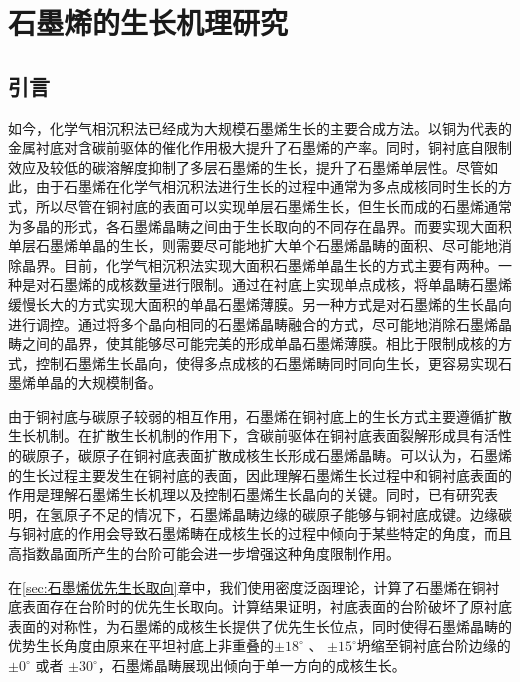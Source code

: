 \chapter{石墨烯的生长机理研究}
\section{引言}
    如今，化学气相沉积法已经成为大规模石墨烯生长的主要合成方法。以铜为代表的金属衬底对含碳前驱体的催化作用极大提升了石墨烯的产率。同时，铜衬底自限制效应及较低的碳溶解度抑制了多层石墨烯的生长，提升了石墨烯单层性。尽管如此，由于石墨烯在化学气相沉积法进行生长的过程中通常为多点成核同时生长的方式，所以尽管在铜衬底的表面可以实现单层石墨烯生长，但生长而成的石墨烯通常为多晶的形式，各石墨烯晶畴之间由于生长取向的不同存在晶界。而要实现大面积单层石墨烯单晶的生长，则需要尽可能地扩大单个石墨烯晶畴的面积、尽可能地消除晶界。目前，化学气相沉积法实现大面积石墨烯单晶生长的方式主要有两种。一种是对石墨烯的成核数量进行限制。通过在衬底上实现单点成核，将单晶畴石墨烯缓慢长大的方式实现大面积的单晶石墨烯薄膜。另一种方式是对石墨烯的生长晶向进行调控。通过将多个晶向相同的石墨烯晶畴融合的方式，尽可能地消除石墨烯晶畴之间的晶界，使其能够尽可能完美的形成单晶石墨烯薄膜。相比于限制成核的方式，控制石墨烯生长晶向，使得多点成核的石墨烯畴同时同向生长，更容易实现石墨烯单晶的大规模制备。
    
    由于铜衬底与碳原子较弱的相互作用，石墨烯在铜衬底上的生长方式主要遵循扩散生长机制。在扩散生长机制的作用下，含碳前驱体在铜衬底表面裂解形成具有活性的碳原子，碳原子在铜衬底表面扩散成核生长形成石墨烯晶畴。可以认为，石墨烯的生长过程主要发生在铜衬底的表面，因此理解石墨烯生长过程中和铜衬底表面的作用是理解石墨烯生长机理以及控制石墨烯生长晶向的关键。同时，已有研究表明，在氢原子不足的情况下，石墨烯晶畴边缘的碳原子能够与铜衬底成键。边缘碳与铜衬底的作用会导致石墨烯畴在成核生长的过程中倾向于某些特定的角度，而且高指数晶面所产生的台阶可能会进一步增强这种角度限制作用。%
    
    在\ref{sec:石墨烯优先生长取向}章中，我们使用密度泛函理论，计算了石墨烯在铜衬底表面存在台阶时的优先生长取向。计算结果证明，衬底表面的台阶破坏了原衬底表面的对称性，为石墨烯的成核生长提供了优先生长位点，同时使得石墨烯晶畴的优势生长角度由原来在平坦衬底上非重叠的$\pm 18 ^{\circ}$ 、 $\pm 15 ^{\circ}$坍缩至铜衬底台阶边缘的$\pm 0 ^{\circ}$ 或者 $\pm 30 ^{\circ}$，石墨烯晶畴展现出倾向于单一方向的成核生长。

